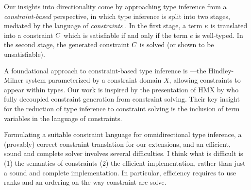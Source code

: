 \documentclass[acmsmall,screen,nonacm]{acmart}
\begin{document}



Our insights into directionality come by approaching type inference from a
\textit{constraint-based} \citep{TODO} perspective, in which type inference
is split into two stages, mediated by the language of \textit{constraints}
\citep{TODO}.  In the first stage, a term $e$ is translated into a constraint
$C$ which is satisfiable if and only if the term $e$ is well-typed. In the
second stage, the generated constraint $C$ is solved (or shown to be
unsatisfiable).


A foundational approach to constraint-based type inference is \HMX
\cite{Odersky-Sulzmann-Wehr@tpos}---the Hindley-Milner system parameterized
by a constraint domain $X$, allowing constraints to appear within types. Our
work is inspired by the presentation of HMX by \citet{Pottier-Remy/emlti}
who fully decoupled constraint generation from constraint solving.  Their
key insight for the reduction of type inference to constraint solving is the
inclusion of term variables in the language of constraints.

Formulating a suitable constraint language for omnidirectional type
inference, a (provably) correct constraint translation for our extensions,
and an efficient, sound and complete solver involves several difficulties.
\Xdidier
{I think what is difficult is (1) the semantics of constraints (2) the
efficient implementation, rather than just a sound and complete
implementation. In particular, efficiency requires to use ranks and an
ordering on the way constraint are solve.}
\end{document}
